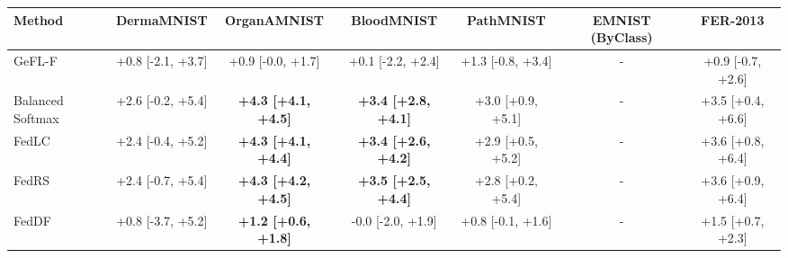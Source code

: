 \begin{tabular}{lcccccc}
\toprule
Method & DermaMNIST & OrganAMNIST & BloodMNIST & PathMNIST & EMNIST (ByClass) & FER-2013\\
\midrule
GeFL-F & +0.8 [-2.1, +3.7] & +0.9 [-0.0, +1.7] & +0.1 [-2.2, +2.4] & +1.3 [-0.8, +3.4] & - & +0.9 [-0.7, +2.6]\\
Balanced Softmax & +2.6 [-0.2, +5.4] & \textbf{+4.3 [+4.1, +4.5]} & \textbf{+3.4 [+2.8, +4.1]} & +3.0 [+0.9, +5.1] & - & +3.5 [+0.4, +6.6]\\
FedLC & +2.4 [-0.4, +5.2] & \textbf{+4.3 [+4.1, +4.4]} & \textbf{+3.4 [+2.6, +4.2]} & +2.9 [+0.5, +5.2] & - & +3.6 [+0.8, +6.4]\\
FedRS & +2.4 [-0.7, +5.4] & \textbf{+4.3 [+4.2, +4.5]} & \textbf{+3.5 [+2.5, +4.4]} & +2.8 [+0.2, +5.4] & - & +3.6 [+0.9, +6.4]\\
FedDF & +0.8 [-3.7, +5.2] & \textbf{+1.2 [+0.6, +1.8]} & -0.0 [-2.0, +1.9] & +0.8 [-0.1, +1.6] & - & +1.5 [+0.7, +2.3]\\
\bottomrule
\end{tabular}
